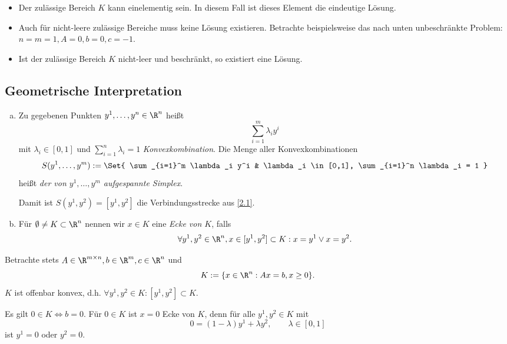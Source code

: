\begin{nt} \label{3.2}
	\begin{itemize}
		\item
			Der zulässige Bereich $K$ kann einelementig sein.
			In diesem Fall ist dieses Element die eindeutige Lösung.
		\item
			Auch für nicht-leere zulässige Bereiche muss keine Lösung existieren.
			Betrachte beispielsweise das nach unten unbeschränkte Problem: $n=m=1, A = 0, b=0, c=-1$.
		\item
			Ist der zulässige Bereich $K$ nicht-leer und beschränkt, so existiert eine Lösung.
	\end{itemize}
\end{nt}

\subsection{Geometrische Interpretation}

\begin{df} \label{3.3}
	\begin{enumerate}[(a)]
		\item
			Zu gegebenen Punkten $y^1, \dotsc, y^n \in \R^n$ heißt
			\[
				\sum_{i=1}^m \lambda_i y^i
			\]
			mit $\lambda_i \in [0,1]$ und $\sum_{i=1}^n \lambda_i = 1$ \emph{Konvexkombination}.
			Die Menge aller Konvexkombinationen
			\[
				S(y^1, \dotsc, y^m) := \Set{
					\sum_{i=1}^m \lambda_i y^i &
					\lambda_i \in [0,1], \sum_{i=1}^n \lambda_i = 1
				}
			\]
			heißt \emph{der von $y^1,\dotsc, y^m$ aufgespannte Simplex}.

			\begin{note}
				Damit ist $S(y^1, y^2) = [y^1, y^2]$ die Verbindungsstrecke aus \ref{2.1}.
			\end{note}
		\item
			Für $\emptyset \neq K \subset \R^n$ nennen wir $x \in K$ eine \emph{Ecke von $K$}, falls
			\[
				\forall y^1, y^2 \in \R^n, x \in [y^1, y^2] \subset K : x = y^1 \lor x = y^2.
			\]
	\end{enumerate}
\end{df}

Betrachte stets $A \in \R^{m\times n}, b\in \R^m, c \in \R^n$ und
\[
	K:= \{ x \in \R^n : Ax = b, x \ge 0 \}.
\]
$K$ ist offenbar konvex, d.h. $\forall y^1, y^2 \in K : [y^1, y^2] \subset K$.

\begin{ex} \label{3.4}
	Es gilt $0 \in K \iff b = 0$.
	Für $0 \in K$ ist $x = 0$ Ecke von $K$, denn für alle $y^1, y^2 \in K$ mit
	\[
		0 = (1-\lambda) y^1 + \lambda y^2,
		\qquad \lambda \in [0,1]
	\]
	ist $y^1 = 0$ oder $y^2 = 0$.
\end{ex}

